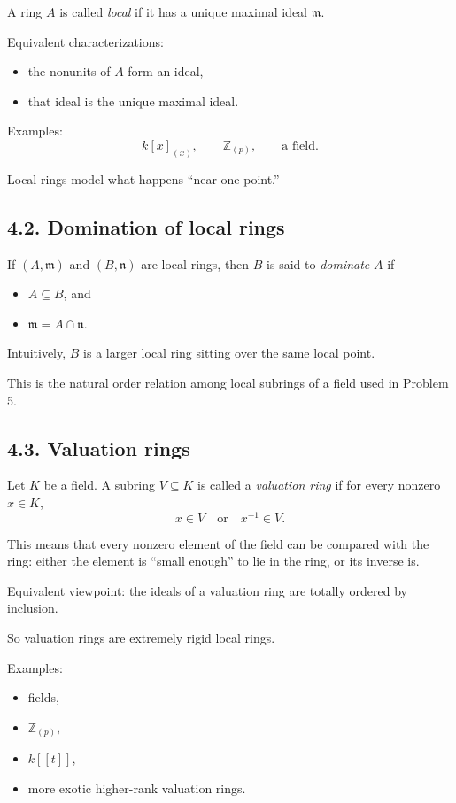\documentclass[12pt,a4paper]{article}
\theoremstyle{plain}
\theoremstyle{definition}      %
\begin{document}
A ring \(A\) is called \emph{local} if it has a unique maximal ideal \(\mathfrak m\).

Equivalent characterizations:
\begin{itemize}
	\item the nonunits of \(A\) form an ideal,
	\item that ideal is the unique maximal ideal.
\end{itemize}

Examples:
\[
k[x]_{(x)},\qquad \mathbb{Z}_{(p)},\qquad \text{a field}.
\]

Local rings model what happens ``near one point.''

\subsection*{4.2. Domination of local rings}

If \((A,\mathfrak m)\) and \((B,\mathfrak n)\) are local rings, then \(B\) is said to \emph{dominate} \(A\) if
\begin{itemize}
	\item \(A\subseteq B\), and
	\item \(\mathfrak m=A\cap \mathfrak n\).
\end{itemize}

Intuitively, \(B\) is a larger local ring sitting over the same local point.

This is the natural order relation among local subrings of a field used in Problem 5.

\subsection*{4.3. Valuation rings}

Let \(K\) be a field. A subring \(V\subseteq K\) is called a \emph{valuation ring} if for every nonzero \(x\in K\),
\[
x\in V \quad\text{or}\quad x^{-1}\in V.
\]

This means that every nonzero element of the field can be compared with the ring: either the element is ``small enough'' to lie in the ring, or its inverse is.

Equivalent viewpoint:
the ideals of a valuation ring are totally ordered by inclusion.

So valuation rings are extremely rigid local rings.

Examples:
\begin{itemize}
	\item fields,
	\item \(\mathbb{Z}_{(p)}\),
	\item \(k[[t]]\),
	\item more exotic higher-rank valuation rings.
\end{itemize}
\end{document}
